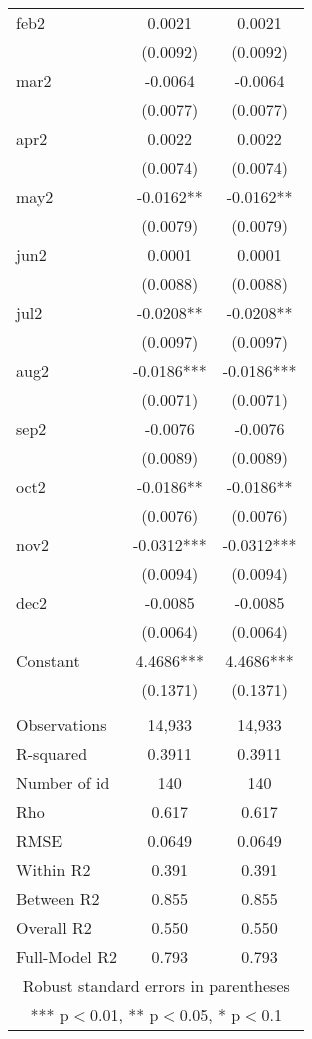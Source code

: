 \documentclass[]{article}
\begin{document}
\begin{tabular}{lcc}
feb2 & 0.0021 & 0.0021 \\
 & (0.0092) & (0.0092) \\
mar2 & -0.0064 & -0.0064 \\
 & (0.0077) & (0.0077) \\
apr2 & 0.0022 & 0.0022 \\
 & (0.0074) & (0.0074) \\
may2 & -0.0162** & -0.0162** \\
 & (0.0079) & (0.0079) \\
jun2 & 0.0001 & 0.0001 \\
 & (0.0088) & (0.0088) \\
jul2 & -0.0208** & -0.0208** \\
 & (0.0097) & (0.0097) \\
aug2 & -0.0186*** & -0.0186*** \\
 & (0.0071) & (0.0071) \\
sep2 & -0.0076 & -0.0076 \\
 & (0.0089) & (0.0089) \\
oct2 & -0.0186** & -0.0186** \\
 & (0.0076) & (0.0076) \\
nov2 & -0.0312*** & -0.0312*** \\
 & (0.0094) & (0.0094) \\
dec2 & -0.0085 & -0.0085 \\
 & (0.0064) & (0.0064) \\
Constant & 4.4686*** & 4.4686*** \\
 & (0.1371) & (0.1371) \\
 &  &  \\
Observations & 14,933 & 14,933 \\
R-squared & 0.3911 & 0.3911 \\
Number of id & 140 & 140 \\
Rho & 0.617 & 0.617 \\
RMSE & 0.0649 & 0.0649 \\
Within R2 & 0.391 & 0.391 \\
Between R2 & 0.855 & 0.855 \\
Overall R2 & 0.550 & 0.550 \\
 Full-Model R2 & 0.793 & 0.793 \\ \hline
\multicolumn{3}{c}{ Robust standard errors in parentheses} \\
\multicolumn{3}{c}{ *** p$<$0.01, ** p$<$0.05, * p$<$0.1} \\
\end{tabular}
\end{document}
